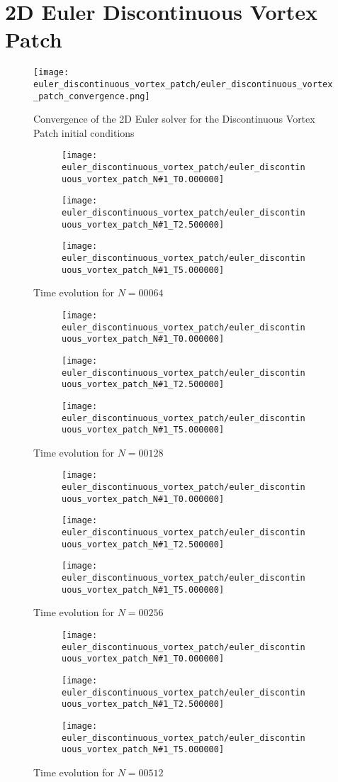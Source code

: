 \documentclass[10pt,a4paper]{article}
\newcommand{\discontinuousvortexpatch}[1]{%
	\begin{figure}[ht!]
		\centering
		\begin{subfigure}{0.45\textwidth}
			\centering
			\texttt{[image: euler\_discontinuous\_vortex\_patch/euler\_discontinuous\_vortex\_patch\_N\#1\_T0.000000]}
		\end{subfigure}
		\begin{subfigure}{0.45\textwidth}
			\centering
			\texttt{[image: euler\_discontinuous\_vortex\_patch/euler\_discontinuous\_vortex\_patch\_N\#1\_T2.500000]}
		\end{subfigure}
		\begin{subfigure}{0.45\textwidth}
			\centering
			\texttt{[image: euler\_discontinuous\_vortex\_patch/euler\_discontinuous\_vortex\_patch\_N\#1\_T5.000000]}
		\end{subfigure}
		\caption{Time evolution for $N = #1$}
	\end{figure}
}
\begin{document}
\section{2D Euler Discontinuous Vortex Patch}
	\begin{figure}[ht!]
		\centering
		\texttt{[image: euler\_discontinuous\_vortex\_patch/euler\_discontinuous\_vortex\_patch\_convergence.png]}
		\caption{Convergence of the 2D Euler solver for the Discontinuous Vortex Patch initial conditions}
	\end{figure}
	\discontinuousvortexpatch{00064}
	\discontinuousvortexpatch{00128}
	\discontinuousvortexpatch{00256}
	\discontinuousvortexpatch{00512}
	
\end{document}
